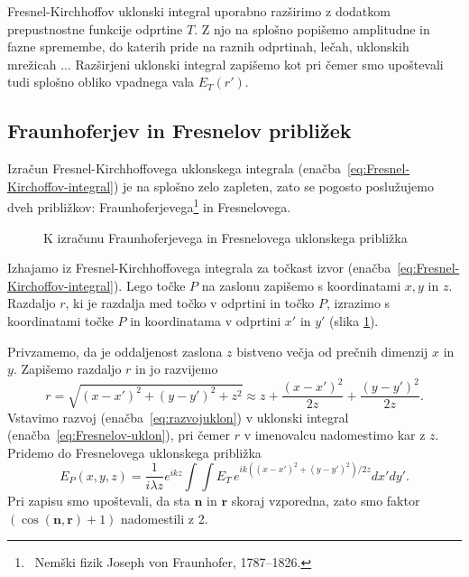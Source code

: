 Fresnel-Kirchhoffov uklonski integral uporabno razširimo z dodatkom prepustnostne funkcije odprtine $T$.
Z njo na splošno popišemo amplitudne in fazne spremembe, do katerih pride na raznih 
odprtinah, lečah, uklonskih mrežicah ... Razširjeni uklonski integral zapišemo kot
pri čemer smo upoštevali tudi splošno obliko vpadnega vala $E_T(r')$.

\subsection*{Fraunhoferjev in Fresnelov približek}
\label{FFuklon}
Izračun Fresnel-Kirchhoffovega uklonskega integrala (enačba~\ref{eq:Fresnel-Kirchoffov-integral}) 
je na splošno zelo zapleten, zato se 
pogosto poslužujemo dveh približkov: Fraunhoferjevega\footnote{~Nemški fizik 
Joseph von Fraunhofer, 1787--1826.} in Fresnelovega. 
\begin{figure}[ht]
\centering {} 
  
\caption{K izračunu Fraunhoferjevega in Fresnelovega uklonskega približka}
\label{fig:Uklon-koordinate}
\end{figure}

Izhajamo iz Fresnel-Kirchhoffovega integrala za točkast izvor
(enačba~\ref{eq:Fresnel-Kirchoffov-integral}). Lego točke $P$ na zaslonu zapišemo 
s koordinatami $x,y$ in $z$. Razdaljo $r$, ki je razdalja med točko v odprtini
in točko $P$, izrazimo s koordinatami točke $P$ in koordinatama v odprtini $x'$ in $y'$ 
(slika \ref{fig:Uklon-koordinate}). 
 
Privzamemo,
da je oddaljenost zaslona $z$ bistveno večja od prečnih dimenzij $x$ in $y$. 
Zapišemo razdaljo $r$ in jo razvijemo
\begin{equation}
r = \sqrt{(x-x')^2+(y-y')^2 + z^2} \approx z + \frac{(x-x')^2}{2z} +\frac{(y-y')^2}{2z}.
\label{eq:razvojuklon}
\end{equation}
Vstavimo razvoj (enačba~\ref{eq:razvojuklon}) v uklonski integral (enačba~\ref{eq:Fresnelov-uklon}), 
pri čemer $r$ v imenovalcu nadomestimo kar z $z$. Pridemo do Fresnelovega uklonskega približka 
\begin{equation}
\label{eq:FresnelApprox}
E_P(x,y,z) =  \frac{1}{i \lambda z } e^{i k z}\int \int E_T\, e^{ik ((x-x')^2+(y-y')^2)/2z} dx' dy'.
\end{equation}
Pri zapisu smo upoštevali, da sta $\mathbf{n}$ in $\mathbf{r}$ skoraj vzporedna, zato smo faktor
$\left(\cos(\mathbf{n},\mathbf{r})+1\right)$ nadomestili z 2.

